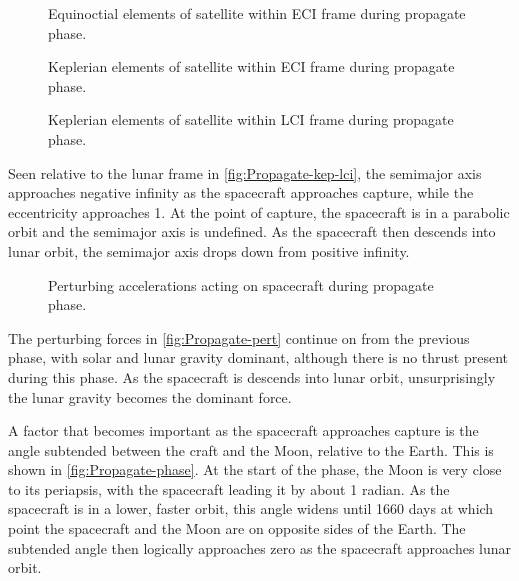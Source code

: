 \begin{figure}
\centering
\def\svgwidth{\figurewidth}

\caption{Equinoctial elements of satellite within ECI frame during propagate phase.}
\label{fig:Propagate-mee}
\end{figure}

\begin{figure}
\centering
\def\svgwidth{\figurewidth}

\caption{Keplerian elements of satellite within ECI frame during propagate phase.}
\label{fig:Propagate-kep}
\end{figure}

\begin{figure}
\centering
\def\svgwidth{\figurewidth}

\caption{Keplerian elements of satellite within LCI frame during propagate phase.}
\label{fig:Propagate-kep-lci}
\end{figure}

Seen relative to the lunar frame in \autoref{fig:Propagate-kep-lci}, the semimajor axis approaches negative infinity as the spacecraft approaches capture, while the eccentricity approaches 1. At the point of capture, the spacecraft is in a parabolic orbit and the semimajor axis is undefined. As the spacecraft then descends into lunar orbit, the semimajor axis drops down from positive infinity.

\begin{figure}
\centering
\def\svgwidth{\figurewidth}

\caption{Perturbing accelerations acting on spacecraft during propagate phase.}
\label{fig:Propagate-pert}
\end{figure}

The perturbing forces in \autoref{fig:Propagate-pert} continue on from the previous phase, with solar and lunar gravity dominant, although there is no thrust present during this phase. As the spacecraft is descends into lunar orbit, unsurprisingly the lunar gravity becomes the dominant force.

%

A factor that becomes important as the spacecraft approaches capture is the angle subtended between the craft and the Moon, relative to the Earth. This is shown in \autoref{fig:Propagate-phase}. At the start of the phase, the Moon is very close to its periapsis, with the spacecraft leading it by about 1 radian. As the spacecraft is in a lower, faster orbit, this angle widens until 1660 days at which point the spacecraft and the Moon are on opposite sides of the Earth. The subtended angle then logically approaches zero as the spacecraft approaches lunar orbit.

